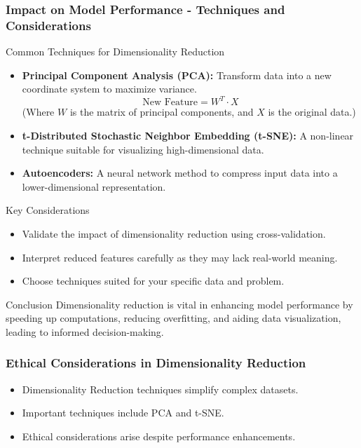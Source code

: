 \documentclass[aspectratio=169]{beamer}
\begin{document}
\begin{frame}[fragile]
    \frametitle{Impact on Model Performance - Techniques and Considerations}
    \begin{block}{Common Techniques for Dimensionality Reduction}
        \begin{itemize}
            \item \textbf{Principal Component Analysis (PCA):} 
            Transform data into a new coordinate system to maximize variance.
            \begin{equation}
                \text{New Feature} = W^T \cdot X
            \end{equation}
            (Where \( W \) is the matrix of principal components, and \( X \) is the original data.)

            \item \textbf{t-Distributed Stochastic Neighbor Embedding (t-SNE):}
            A non-linear technique suitable for visualizing high-dimensional data.

            \item \textbf{Autoencoders:}
            A neural network method to compress input data into a lower-dimensional representation.
        \end{itemize}
    \end{block}

    \begin{block}{Key Considerations}
        \begin{itemize}
            \item Validate the impact of dimensionality reduction using cross-validation.
            \item Interpret reduced features carefully as they may lack real-world meaning.
            \item Choose techniques suited for your specific data and problem.
        \end{itemize}
    \end{block}

    \begin{block}{Conclusion}
        Dimensionality reduction is vital in enhancing model performance by speeding up computations, reducing overfitting, and aiding data visualization, leading to informed decision-making.
    \end{block}
\end{frame}

\begin{frame}[fragile]
    \frametitle{Ethical Considerations in Dimensionality Reduction}
    \begin{itemize}
        \item Dimensionality Reduction techniques simplify complex datasets.
        \item Important techniques include PCA and t-SNE.
        \item Ethical considerations arise despite performance enhancements.
    \end{itemize}
\end{frame}
\end{document}
